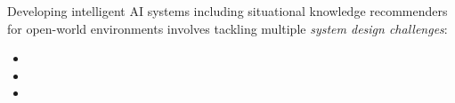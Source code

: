 Developing intelligent AI systems including situational knowledge recommenders for open-world environments involves tackling multiple \textit{system design challenges}:
\begin{itemize}[nosep, leftmargin=0pt]%
    \item 
    
    \item 
    
    \item 
    
\end{itemize}
